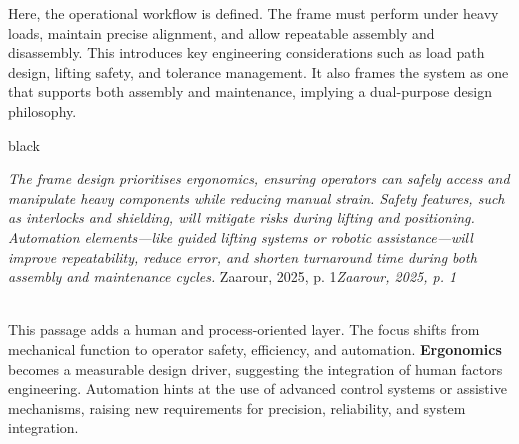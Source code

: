 \documentclass[9pt]{extarticle}
\newcommand{\formalsource}{}
\newenvironment{formal}[3][]{	\renewcommand{\formalsource}{#1}
	\def\lefty{\color{#2}\textquotedblleft}
	\def\righty{\color{#2}\textquotedblright}
	\def\FrameCommand{%
		\hspace{1pt}%
		{\color{#2}\vrule width 2pt}%
		{\color{#3}\vrule width 4pt}%
		\colorbox{#3}%
	}%
	\MakeFramed{\advance\hsize-\width\FrameRestore}%
	\begin{adjustwidth}{5pt}{7pt}%
		\ifx#2\empty\else\smash{\raisebox{-0.5em}{\Huge\lefty}}\hspace{0em}\fi%
	}{%
		\hspace{0em}\smash{\raisebox{-0.5em}{\Huge\righty}}\hfill%
		\ifx\formalsource\empty\else\hfill{\footnotesize\textit{\formalsource}}\fi%
	\end{adjustwidth}%
	\endMakeFramed%
	\noindent%
	\\
}
\begin{document}
Here, the operational workflow is defined. The frame must perform under heavy loads, maintain precise alignment, and allow repeatable assembly and disassembly. This introduces key engineering considerations such as load path design, lifting safety, and tolerance management. It also frames the system as one that supports {both assembly and maintenance}, implying a dual-purpose design philosophy.\\[1em]
\begin{formal}[Zaarour, 2025, p. 1]{black}{white}
\textit{	The frame design prioritises {ergonomics}, ensuring operators can safely access and manipulate heavy components while reducing manual strain. Safety features, such as interlocks and shielding, will mitigate risks during lifting and positioning. Automation elements—like guided lifting systems or robotic assistance—will improve repeatability, reduce error, and shorten turnaround time during both assembly and maintenance cycles.}
\end{formal}
This passage adds a human and process-oriented layer. The focus shifts from mechanical function to {operator safety, efficiency, and automation}. \textbf{Ergonomics} becomes a measurable design driver, suggesting the integration of human factors engineering. Automation hints at the use of advanced control systems or assistive mechanisms, raising new requirements for precision, reliability, and system integration.
\end{document}
